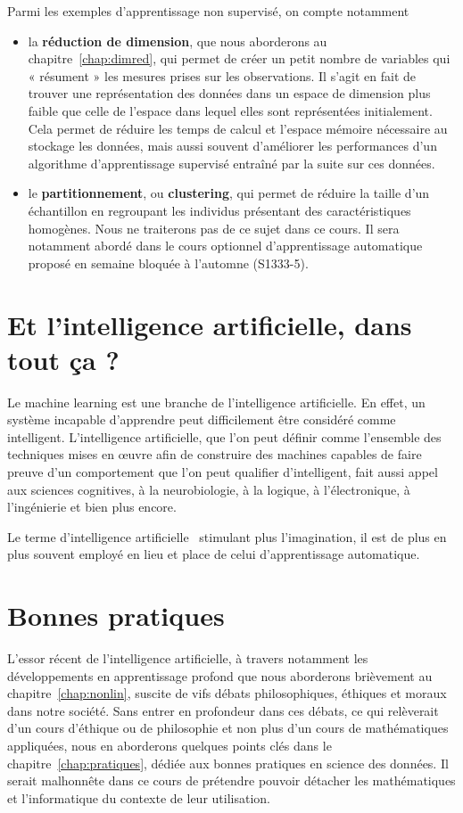 Parmi les exemples d'apprentissage non supervisé, on compte notamment 
\begin{itemize}
	\item la \textbf{réduction de dimension}, que nous aborderons au
	chapitre~\ref{chap:dimred}, qui permet de créer un petit nombre de variables
	qui « résument » les mesures prises sur les observations. Il s'agit en fait de trouver
	une représentation des données dans un espace de dimension plus faible que
	celle de l'espace dans lequel elles sont représentées initialement. Cela
	permet de réduire les temps de calcul et l'espace mémoire nécessaire au
	stockage les données, mais aussi souvent d'améliorer les performances d'un
	algorithme d'apprentissage supervisé entraîné par la suite sur ces données.
	\item le \textbf{partitionnement}, ou \textbf{clustering}, qui permet de
	réduire la taille d'un échantillon en regroupant les individus présentant des
	caractéristiques homogènes. Nous ne traiterons pas de ce sujet dans ce
	cours. Il sera notamment abordé dans le cours optionnel d'apprentissage
	automatique proposé en semaine bloquée à l'automne (S1333-5).
\end{itemize}


\section{Et l'intelligence artificielle, dans tout ça ?}
Le machine learning est une branche de l'intelligence
artificielle. En effet, un système incapable d'apprendre peut difficilement
être considéré comme intelligent. 
L'intelligence artificielle, que l'on peut définir comme l'ensemble des techniques mises en
{\oe}uvre afin de construire des machines capables de faire preuve d'un
comportement que l'on peut qualifier d'intelligent, fait aussi appel aux
sciences cognitives, à la neurobiologie, à la logique, à l'électronique, à
l'ingénierie et bien plus encore.

Le terme d'\og intelligence artificielle \fg~stimulant plus
l'imagination, il est de plus en plus souvent employé en lieu et
place de celui d'apprentissage automatique.

\section{Bonnes pratiques}
L'essor récent de l'intelligence artificielle, à travers notamment les
développements en apprentissage profond que nous aborderons brièvement au
chapitre~\ref{chap:nonlin}, suscite de vifs débats philosophiques, éthiques et
moraux dans notre société. Sans entrer en profondeur dans ces débats, ce qui
relèverait d'un cours d'éthique ou de philosophie et non plus d'un cours de
mathématiques appliquées, nous en aborderons quelques points clés dans le
chapitre~\ref{chap:pratiques}, dédiée aux bonnes pratiques en science des
données. Il serait malhonnête dans ce cours de prétendre pouvoir
détacher les mathématiques et l'informatique du contexte de leur utilisation.


